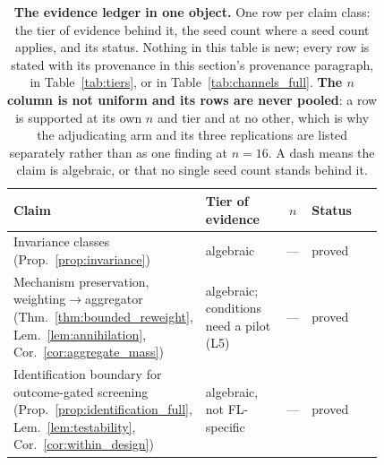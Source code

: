 \documentclass{article}
\begin{document}
\begin{table}[h]
\centering
\small\setlength{\tabcolsep}{4pt}
\caption{\textbf{The evidence ledger in one object.} One row per claim class: the tier of evidence behind it, the seed count where a seed count applies, and its status. Nothing in this table is new; every row is stated with its provenance in this section's provenance paragraph, in Table~\ref{tab:tiers}, or in Table~\ref{tab:channels_full}. \textbf{The $n$ column is not uniform and its rows are never pooled}: a row is supported at its own $n$ and tier and at no other, which is why the adjudicating arm and its three replications are listed separately rather than as one finding at $n{=}16$. A dash means the claim is algebraic, or that no single seed count stands behind it.}
\label{tab:evidence}
\scriptsize
\begin{tabular}{@{}p{0.375\linewidth}p{0.235\linewidth}cp{0.215\linewidth}@{}}
\toprule
Claim & Tier of evidence & $n$ & Status \\
\midrule
Invariance classes (Prop.~\ref{prop:invariance}) & algebraic & --- & proved \\
Mechanism preservation, weighting$\to$aggregator (Thm.~\ref{thm:bounded_reweight}, Lem.~\ref{lem:annihilation}, Cor.~\ref{cor:aggregate_mass}) & algebraic; conditions need a pilot (L5) & --- & proved \\
Identification boundary for outcome-gated screening (Prop.~\ref{prop:identification_full}, Lem.~\ref{lem:testability}, Cor.~\ref{cor:within_design}) & algebraic, not FL-specific & --- & proved \\

\end{tabular}
\end{table}
\end{document}
